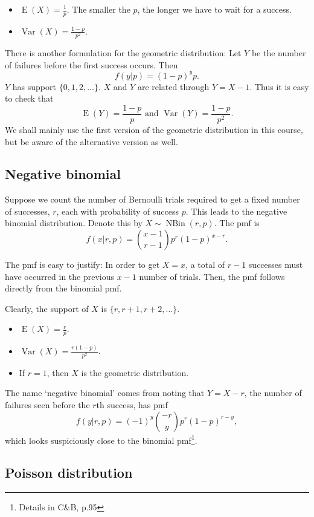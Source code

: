 \documentclass[
]{book}
\providecommand{\tightlist}{%
  \setlength{\itemsep}{0pt}\setlength{\parskip}{0pt}}
\DeclareMathOperator{\E}{E}
\DeclareMathOperator{\Var}{Var}
\DeclareMathOperator{\NBin}{NBin}
\theoremstyle{definition}
\theoremstyle{definition}
\theoremstyle{definition}
\theoremstyle{definition}
\theoremstyle{remark}
\begin{document}
\begin{itemize}
\tightlist
\item
  \(\E(X)=\frac{1}{p}\). The smaller the \(p\), the longer we have to wait for a success.
\item
  \(\Var(X)=\frac{1-p}{p^2}\).
\end{itemize}

There is another formulation for the geometric distribution: Let \(Y\) be the number of failures before the first success occurs. Then
\[
f(y|p) = (1-p)^yp.
\]
\(Y\) has support \(\{0,1,2,\dots\}\). \(X\) and \(Y\) are related through \(Y=X-1\). Thus it is easy to check
that
\[
\E(Y) = \frac{1-p}{p} \text{ and } \Var(Y)=\frac{1-p}{p^2}.
\]
We shall mainly use the first version of the geometric distribution in this course, but be aware of the alternative version as well.

\hypertarget{negative-binomial}{%
\subsection{Negative binomial}\label{negative-binomial}}

Suppose we count the number of Bernoulli trials required to get a fixed number of successes, \(r\), each with probability of success \(p\).
This leads to the negative binomial distribution.
Denote this by \(X\sim\NBin(r,p)\). The pmf is
\[
  f(x|r,p)= {x-1 \choose r-1} p^r (1-p)^{x-r}.
\]

The pmf is easy to justify: In order to get \(X=x\), a total of \(r-1\) successes must have occurred in the previous \(x-1\) number of trials. Then, the pmf follows directly from the binomial pmf.

Clearly, the support of \(X\) is \(\{r, r+1, r+2, \dots \}\).

\begin{itemize}
\tightlist
\item
  \(\E(X)=\frac{r}{p}\).
\item
  \(\Var(X)=\frac{r(1-p)}{p^2}\).
\item
  If \(r=1\), then \(X\) is the geometric distribution.
\end{itemize}

The name `negative binomial' comes from noting that \(Y=X-r\), the number of failures seen before the \(r\)th success, has pmf
\[
  f(y|r,p) = (-1)^y{-r \choose y} p^r(1-p)^{r-y},
\]
which looks suspiciously close to the binomial pmf\footnote{Details in C\&B, p.95}.

\hypertarget{poisson-distribution}{%
\subsection{Poisson distribution}\label{poisson-distribution}}
\end{document}
